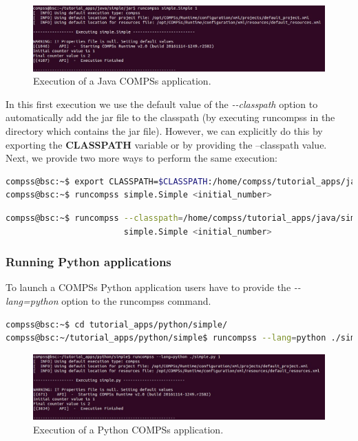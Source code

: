 \begin{figure}[h!]
  \centering
    \includegraphics[width=\textwidth]{./Sections/2_Execution/Figures/java_execution.jpeg}
    \caption{Execution of a Java COMPSs application.}
    \label{fig:java_execution}
\end{figure}
\vspace{-0.4cm}

In this first execution we use the default value of the \textit{-{}-classpath} option to automatically add the jar
file to the classpath (by executing runcompss in the directory which contains the jar file). However,
we can explicitly do this by exporting the \textbf{CLASSPATH} variable or by providing the 
--classpath value. Next, we provide two more ways to perform the same execution:

\begin{lstlisting}[language=bash]
compss@bsc:~$ export CLASSPATH=$CLASSPATH:/home/compss/tutorial_apps/java/simple/jar/simple.jar
compss@bsc:~$ runcompss simple.Simple <initial_number>
\end{lstlisting}

\begin{lstlisting}[language=bash]
compss@bsc:~$ runcompss --classpath=/home/compss/tutorial_apps/java/simple/jar/simple.jar 
                        simple.Simple <initial_number>
\end{lstlisting}


\subsubsection{Running Python applications}
To launch a COMPSs Python application users have to provide the \textit{-{}-lang=python} option to the runcompss command. 

\begin{lstlisting}[language=bash]
compss@bsc:~$ cd tutorial_apps/python/simple/
compss@bsc:~/tutorial_apps/python/simple$ runcompss --lang=python ./simple.py <initial_number>
\end{lstlisting}

\begin{figure}[h!]
  \centering
    \includegraphics[width=\textwidth]{./Sections/2_Execution/Figures/python_execution.jpeg}
    \caption{Execution of a Python COMPSs application.}
    \label{fig:python_execution}
\end{figure}
\vspace{-0.4cm}


